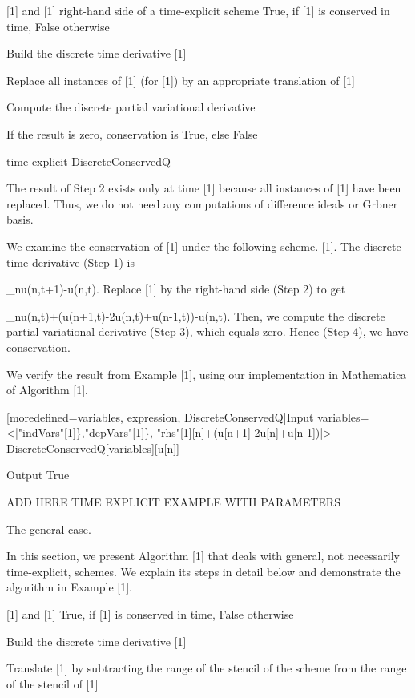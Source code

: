 \documentclass{article}
\begin{document}
{	
	{[1] and [1] right-hand side of a time-explicit scheme}
	{ {True}, if [1] is conserved in time, {False} otherwise }
	
	 Build the discrete time derivative [1]
	
	 Replace all instances of [1] (for [1]) by an appropriate translation of [1]
	
	 Compute the discrete partial variational derivative
	
	 If the result is zero, conservation is {True}, else {False}
	
	{{time-explicit DiscreteConservedQ}}
	

The result of Step 2 exists only at time [1] because all instances of [1] have been replaced. Thus, we do not need any computations of difference ideals or Gr{}bner basis.

	
	We examine the conservation of [1] under the following scheme.
	[1].
	The discrete time derivative (Step 1) is
	
		_{n}u(n,t+1)-u(n,t).
	Replace [1] by the right-hand side (Step 2) to get
	
		_{n}u(n,t)+(u(n+1,t)-2u(n,t)+u(n-1,t))-u(n,t).
	Then, we compute the discrete partial variational derivative (Step 3), which equals zero. Hence (Step 4), we have conservation.


	
	We verify the result from Example [1], using our implementation in {Mathematica} of Algorithm [1].
	
	
		[moredefined={variables, expression, DiscreteConservedQ}]{Input}
  variables=<|"indVars"[1]\},"depVars"[1]\},
  "rhs"[1][n]+(u[n+1]-2u[n]+u[n-1])|>
  DiscreteConservedQ[variables][u[n]]
  

		{Output}
  True

	


{ ADD HERE TIME EXPLICIT EXAMPLE WITH PARAMETERS} 



The general case.



In this section, we present Algorithm [1] that deals with general, not necessarily time-explicit, schemes. We explain its steps in detail below and demonstrate the algorithm in Example [1].

	
	{[1] and [1] }
	{ {True}, if [1] is conserved in time, {False} otherwise }
	
	 Build the discrete time derivative [1]
	
	Translate [1] by subtracting the range of the stencil of the scheme from the range of the stencil of [1]
	
}
\end{document}
